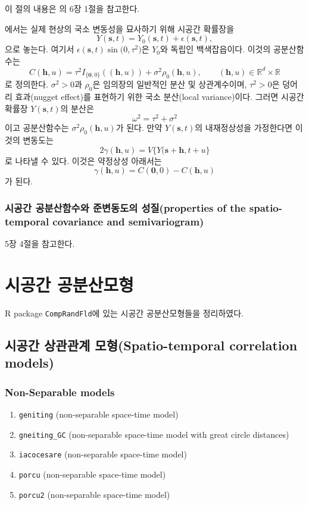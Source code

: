 \documentclass[b5paper,]{scrbook}
\theoremstyle{plain}
\theoremstyle{definition}
\numberwithin{equation}{section}
\begin{document}
이 절의 내용은 \citep{Cressie2015}의 6장 1절을 참고한다.

\citep{Padoan2015}에서는 실제 현상의 국소 변동성을 묘사하기 위해 시공간
확률장을
\[Y(\mathbf{s}, t)=Y_{0}(\mathbf{s},t) +\epsilon (\mathbf{s},t),\] 으로
놓는다. 여기서 \(\epsilon(\mathbf{s},t)\sin\mathcal(0,\tau^{2})\)은
\(Y_{0}\)와 독립인 백색잡읍이다. 이것의 공분산함수는
\[C(\mathbf{h},u)=\tau^{2}I_{\{\mathbf{0},0\}}((\mathbf{h},u))+\sigma^{2}\rho_{0}(\mathbf{h},u), \qquad{(\mathbf{h},u)\in\mathbb{R}^{d}\times \mathbb{R}}\]
로 정의한다. \(\sigma^{2}>0\)과 \(\rho_{0}\)은 임의장의 일반적인 분산 및
상관계수이며, \(\tau^{2}>0\)은 덩어리 효과(nugget effect)를 표현하기
위한 국소 분산(local variance)이다. 그러면 시공간 확률장
\(Y(\mathbf{s},t)\)의 분산은 \[\omega^{2}=\tau^{2}+\sigma^{2}\] 이고
공분산함수는 \(\sigma^{2}\rho_{0}(\mathbf{h},u)\)가 된다. 만약
\(Y(\mathbf{s},t)\)의 내재정상성을 가정한다면 이것의 변동도는
\[2\gamma(\mathbf{h},u)=V\{ Y(\mathbf{s}+\mathbf{h}, t+u\}\] 로 나타낼
수 있다. 이것은 약정상성 아래서는
\[\gamma(\mathbf{h},u)=C(\mathbf{0},0) - C(\mathbf{h}, u)\] 가 된다.

\subsection{시공간 공분산함수와 준변동도의 성질(properties of the
spatio-temporal covariance and
semivariogram)}\label{---properties-of-the-spatio-temporal-covariance-and-semivariogram}

\citep{Montero2015} 5장 4절을 참고한다.

\chapter{시공간 공분산모형}\label{stcovmodel}

R package \texttt{CompRandFld}에 있는 시공간 공분산모형들을 정리하였다.

\section{시공간 상관관계 모형(Spatio-temporal correlation
models)}\label{--spatio-temporal-correlation-models}

\subsection{Non-Separable models}\label{non-separable-models}

\begin{enumerate}
\def\labelenumi{\arabic{enumi}.}
\item
  \texttt{geniting} (non-separable space-time model)
\item
  \texttt{gneiting\_GC} (non-separable space-time model with great
  circle distances)
\item
  \texttt{iacocesare} (non-separable space-time model)
\item
  \texttt{porcu} (non-separable space-time model)
\item
  \texttt{porcu2} (non-separable space-time model)
\end{enumerate}
\end{document}
